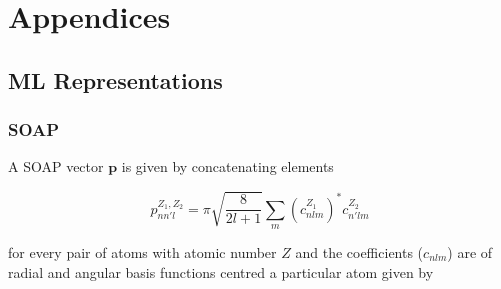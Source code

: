 \documentclass[../main.tex]{subfiles}
\begin{document}
\setcounter{footnote}{0} 

\chapter{Appendices}

\section{ML Representations}
\subsection{SOAP} \label{section::soap_derivation}

A SOAP vector\cite{Bartok2013} $\boldsymbol{p}$ is given by concatenating elements

\begin{equation}
	p_{nn'l}^{Z_1, Z_2} = \pi \sqrt{\frac{8}{2l + 1}} \sum_m \left(c_{nlm}^{Z_1}\right)^* c_{n'lm}^{Z_2}
\end{equation}

for every pair of atoms with atomic number $Z$ and the coefficients ($c_{nlm}$) are of radial and angular basis functions centred a particular atom given by
\end{document}

